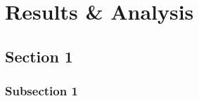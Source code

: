 
\chapter{Results \& Analysis}


\section[Section 1]{Section 1}
\subsection[Subsection 1]{Subsection 1}